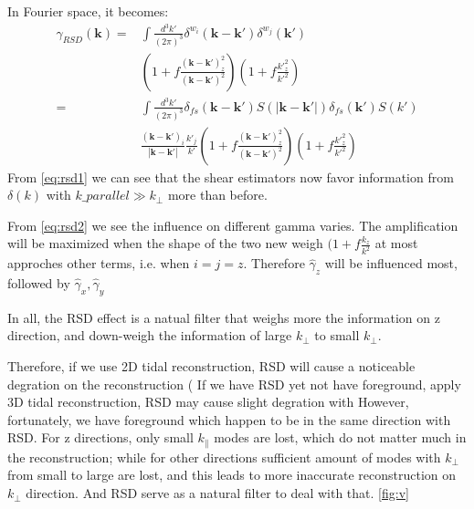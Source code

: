 In Fourier space, it becomes:
\begin{subequations}
\begin{align}
\hat\gamma_{RSD}(\bm{k})    
=&\int \frac{d^3k\prime}{(2\pi)^3}\delta^{w_i}(\bm{k}-\bm{k}\prime)\delta^{w_j}(\bm{k}\prime)\label{eq:rsd1}\\
 &(1+f\frac{(\bm{k}-\bm{k}\prime)_z^2}{(\bm{k}-\bm{k}\prime)^2})(1+f\frac{k\prime_z^2}{k\prime^2})\nonumber\\
=&\int \frac{d^3k\prime}{(2\pi)^3}
\delta_{fs}(\bm{k}-\bm{k}\prime)S(|\bm{k}-\bm{k}\prime|)\delta_{fs}(\bm{k}\prime)S(k\prime)\label{eq:rsd2}\\
&\frac{(\bm{k}-\bm{k}\prime)_i}{|\bm{k}-\bm{k}\prime|}\frac{k\prime_j}{k\prime}
(1+f\frac{(\bm{k}-\bm{k}\prime)_z^2}{(\bm{k}-\bm{k}\prime)^2})(1+f\frac{k\prime_z^2}{k\prime^2})\nonumber
\end{align}
\end{subequations}
From \eqref{eq:rsd1} we can see that the shear estimators now favor 
information from $\delta(k)$ with $k\_parallel\gg k_\perp$ more than before.

From \eqref{eq:rsd2} we see the influence on different gamma varies. 
The amplification will be maximized 
when the shape of the two new weigh $(1+f\frac{k_z}{k^2}$ 
at most approches other terms, 
i.e. when $i=j=z$. 
Therefore $\hat\gamma_z$ will be influenced most, followed by $\hat\gamma_x,\hat\gamma_y$

In all, the RSD effect is a natual filter that weighs more the information on z direction, and down-weigh the information of large $k_\perp$ to small $k_\perp$.

Therefore, if we use 2D tidal reconstruction, RSD will cause a noticeable degration on the reconstruction (%
If we have RSD yet not have foreground, apply 3D tidal reconstruction, 
RSD may cause slight degration with  
However, fortunately, 
we have foreground which happen to be in the same direction with RSD. 
For z directions, only small $k_\parallel$ modes are lost, which do not matter much in the reconstruction;
while for other directions sufficient amount of modes with $k_\perp$ from small to large are lost, 
and this leads to more inaccurate reconstruction on $k_\perp$ direction. 
And RSD serve as a natural filter to deal with that. \ref{fig:v}


